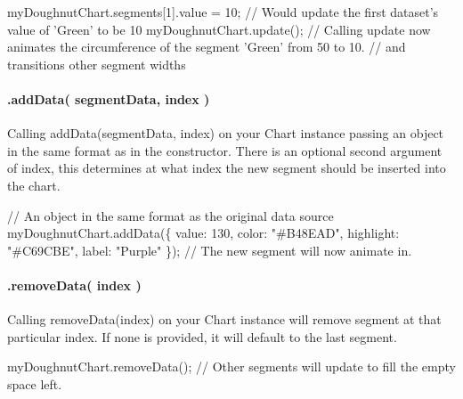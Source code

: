 \begin{DoxyCode}
myDoughnutChart.segments[1].value = 10;
// Would update the first dataset's value of 'Green' to be 10
myDoughnutChart.update();
// Calling update now animates the circumference of the segment 'Green' from 50 to 10.
// and transitions other segment widths
\end{DoxyCode}


\paragraph*{.add\+Data( segment\+Data, index )}

Calling {\ttfamily add\+Data(segment\+Data, index)} on your Chart instance passing an object in the same format as in the constructor. There is an optional second argument of \textquotesingle{}index\textquotesingle{}, this determines at what index the new segment should be inserted into the chart.


\begin{DoxyCode}
// An object in the same format as the original data source
myDoughnutChart.addData(\{
    value: 130,
    color: "#B48EAD",
    highlight: "#C69CBE",
    label: "Purple"
\});
// The new segment will now animate in.
\end{DoxyCode}


\paragraph*{.remove\+Data( index )}

Calling {\ttfamily remove\+Data(index)} on your Chart instance will remove segment at that particular index. If none is provided, it will default to the last segment.


\begin{DoxyCode}
myDoughnutChart.removeData();
// Other segments will update to fill the empty space left.
\end{DoxyCode}
 